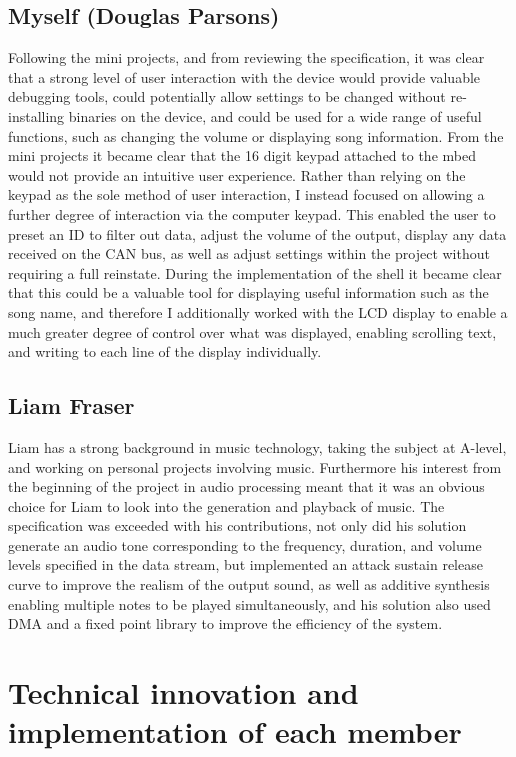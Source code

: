 \subsection*{Myself (Douglas Parsons)}
Following the mini projects, and from reviewing the specification, it was clear 
that a strong level of user interaction with the device would provide valuable 
debugging tools, could potentially allow settings to be changed without 
re-installing binaries on the device, and could be used for a wide range of 
useful functions, such as changing the volume or displaying song information. 
From the mini projects it became clear that the 16 digit keypad attached to the 
mbed would not provide an intuitive user experience. Rather than relying on 
the keypad as the sole method of user interaction, I instead focused 
on allowing a further degree of interaction via the computer keypad. This 
enabled the user to preset an ID to filter out data, adjust the volume of the 
output, display any data received on the CAN bus, as 
well as adjust settings within the project without requiring a full reinstate.
During the implementation of the shell it became clear that this could be a 
valuable tool for displaying useful information such as the song name, and 
therefore I additionally worked with the LCD display to enable a much greater 
degree of control over what was displayed, enabling scrolling text, and writing 
to each line of the display individually.

\subsection*{Liam Fraser}
Liam has a strong background in music technology, taking the subject at A-level,
and working on personal projects involving music. Furthermore his interest from 
the beginning of the project in audio processing meant that it was an obvious 
choice for Liam to look into the generation and playback of music. The 
specification was exceeded with his contributions, not only did his solution 
generate an audio tone corresponding to the frequency, duration, and volume 
levels specified in the data stream, but implemented an attack sustain release 
curve to improve the realism of the output sound, as well as additive synthesis 
enabling multiple notes to be played simultaneously, and his solution also 
used DMA and a fixed point library to improve the efficiency of the system. 

\section{Technical innovation and implementation of each member}
